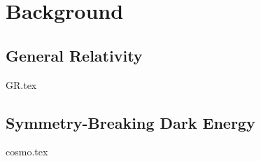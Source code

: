 \documentclass[UKenglish]{texmex/uiomasterthesis}
\begin{document}



\part{Background}\label{part:bckg}






\chapter{General Relativity}\label{chap:GR}
    {{GR.tex}}



\chapter{Symmetry-Breaking Dark Energy}\label{chap:cosmo}
    {{cosmo.tex}}


\end{document}
